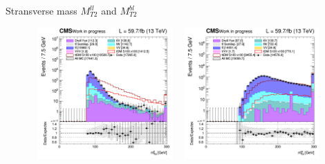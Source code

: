 \documentclass[8pt]{beamer}
\begin{document}
\begin{frame}{Stransverse mass $M_{T2}^{ll}$ and $M_{T2}^{bl}$}
\justifying
\begin{figure}[htbp]
\centering
\begin{minipage}[b]{.49\textwidth}
\includegraphics[width=5.5cm, height=5cm]{figs/2018/SmearSR-ttDM-scalar100/log_cratio_topCR_ll_mt2ll.png}
\end{minipage}\hfill
\begin{minipage}[b]{.49\textwidth}
\includegraphics[width=5.5cm, height=5cm]{figs/2018/SmearSR-ttDM-scalar100/log_cratio_topCR_ll_mt2bl.png}
\end{minipage} \hfill
\label{fig:SRdiscmblt}
\end{figure}
\end{frame}
\end{document}
